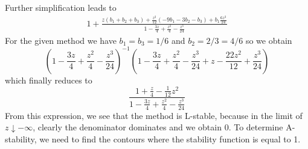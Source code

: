 \documentclass[10pt,a4paper]{article}
\begin{document}
Further simplification leads to
\begin{align*}
  1 + \frac{z (b_1 + b_2 + b_3) + \frac{z^2}{12}\left(-9b_1 - 3b_2 - b_3\right) +  b_1\frac{6z^3}{24}}{1 - \frac{3z}{4} + \frac{z^2}{4} - \frac{z^3}{24}}
\end{align*}
For the given method we have $b_1 = b_3 = 1/6$ and $b_2 = 2/3 = 4/6$ so we obtain
\begin{equation*}
  \left(1 - \frac{3z}{4} + \frac{z^2}{4} - \frac{z^3}{24}\right)^{-1}\left(1 - \frac{3z}{4} + \frac{z^2}{4} - \frac{z^3}{24} + z - \frac{22 z^2}{12} + \frac{z^3}{24} \right)
\end{equation*}
which finally reduces to
\begin{equation*}
  \frac{1 + \frac{z}{4} - \frac{1}{12}z^2}{1 - \frac{3z}{4} + \frac{z^2}{4} - \frac{z^3}{24}}
\end{equation*}
From this expression, we see that the method is L-stable, because in the limit of $z\downarrow -\infty$, clearly the denominator dominates and we obtain 0.
To determine A-stability, we need to find the contours where the stability function is equal to 1.
\end{document}
